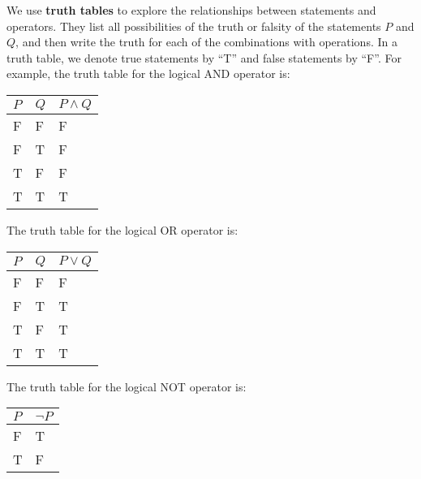 We use \textbf{truth tables} to explore the relationships between statements and operators. They list all possibilities of the truth or falsity of the statements $P$ and $Q$, and then write the truth for each of the combinations with operations. In a truth table, we denote true statements by ``T'' and false statements by ``F''. For example, the truth table for the logical AND operator is:
\begin{table}[h]
    \centering
    \begin{tabular}{|l|l||l|}
        \hline
        $P$ & $Q$ & $P\land Q$ \\ \hline
        F   & F   & F          \\ \hline
        F   & T   & F          \\ \hline
        T   & F   & F          \\ \hline
        T   & T   & T          \\ \hline
    \end{tabular}
\end{table}

The truth table for the logical OR operator is:
\begin{table}[h]
    \centering
    \begin{tabular}{|l|l||l|}
        \hline
        $P$ & $Q$ & $P\lor Q$ \\ \hline
        F   & F   & F         \\ \hline
        F   & T   & T         \\ \hline
        T   & F   & T         \\ \hline
        T   & T   & T         \\ \hline
    \end{tabular}
\end{table}

The truth table for the logical NOT operator is:
\begin{table}[h]
    \centering
    \begin{tabular}{|l||l|}
        \hline
        $P$ & $\lnot P$ \\ \hline
        F   & T         \\ \hline
        T   & F         \\ \hline
    \end{tabular}
\end{table}

